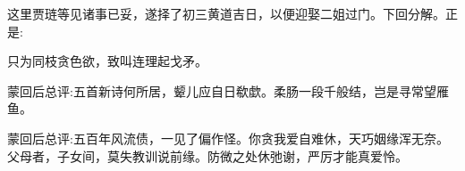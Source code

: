 \begin{parag}
    这里贾琏等见诸事已妥，遂择了初三黄道吉日，以便迎娶二姐过门。下回分解。正是:
\end{parag}


\begin{poem}
    \begin{pl}只为同枝贪色欲，致叫连理起戈矛。\end{pl}

\end{poem}



\begin{parag}
    \begin{note}蒙回后总评:五首新诗何所居，颦儿应自日欷歔。柔肠一段千般结，岂是寻常望雁鱼。\end{note}
\end{parag}


\begin{parag}
    \begin{note}蒙回后总评:五百年风流债，一见了偏作怪。你贪我爱自难休，天巧姻缘浑无奈。父母者，子女间，莫失教训说前缘。防微之处休弛谢，严厉才能真爱怜。\end{note}
\end{parag}